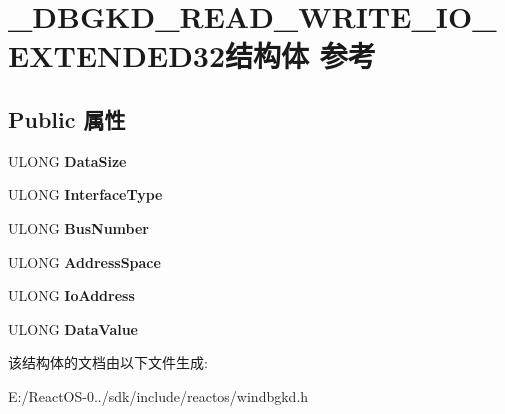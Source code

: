 \hypertarget{struct___d_b_g_k_d___r_e_a_d___w_r_i_t_e___i_o___e_x_t_e_n_d_e_d32}{}\section{\+\_\+\+D\+B\+G\+K\+D\+\_\+\+R\+E\+A\+D\+\_\+\+W\+R\+I\+T\+E\+\_\+\+I\+O\+\_\+\+E\+X\+T\+E\+N\+D\+E\+D32结构体 参考}
\label{struct___d_b_g_k_d___r_e_a_d___w_r_i_t_e___i_o___e_x_t_e_n_d_e_d32}
\subsection*{Public 属性}
\begin{DoxyCompactItemize}
\item 
\mbox{\label{struct___d_b_g_k_d___r_e_a_d___w_r_i_t_e___i_o___e_x_t_e_n_d_e_d32_af1d99d47e99e61fc6de9035a8c6256ad}} 
U\+L\+O\+NG {\bfseries Data\+Size}
\item 
\mbox{\label{struct___d_b_g_k_d___r_e_a_d___w_r_i_t_e___i_o___e_x_t_e_n_d_e_d32_aecf242e11e75054d5aa625ab61b80753}} 
U\+L\+O\+NG {\bfseries Interface\+Type}
\item 
\mbox{\label{struct___d_b_g_k_d___r_e_a_d___w_r_i_t_e___i_o___e_x_t_e_n_d_e_d32_ac3376ef6b77f11fb4ec88079e74dd24f}} 
U\+L\+O\+NG {\bfseries Bus\+Number}
\item 
\mbox{\label{struct___d_b_g_k_d___r_e_a_d___w_r_i_t_e___i_o___e_x_t_e_n_d_e_d32_a511476088cc52a8d998319d213408abf}} 
U\+L\+O\+NG {\bfseries Address\+Space}
\item 
\mbox{\label{struct___d_b_g_k_d___r_e_a_d___w_r_i_t_e___i_o___e_x_t_e_n_d_e_d32_a12998dd80b392e2def9b387c4c5edcc9}} 
U\+L\+O\+NG {\bfseries Io\+Address}
\item 
\mbox{\label{struct___d_b_g_k_d___r_e_a_d___w_r_i_t_e___i_o___e_x_t_e_n_d_e_d32_a96d60103144498159cdcd14bfc37e8cf}} 
U\+L\+O\+NG {\bfseries Data\+Value}
\end{DoxyCompactItemize}


该结构体的文档由以下文件生成\+:\begin{DoxyCompactItemize}
\item 
E\+:/\+React\+O\+S-\/0../sdk/include/reactos/windbgkd.\+h\end{DoxyCompactItemize}
